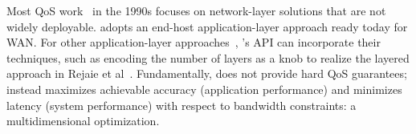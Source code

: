  Most QoS work~\cite{ferrari1990scheme, shenker1994integrated,
  shenker1995fundamental} in the 1990s focuses on network-layer solutions that
are not widely deployable. \sysname{} adopts an end-host application-layer
approach ready today for WAN. For other application-layer
approaches~\cite{vandalore2001survey}, \sysname{}'s API can incorporate their
techniques, such as encoding the number of layers as a knob to realize the
layered approach in Rejaie et al~\cite{rejaie2000layered}. Fundamentally,
\sysname{} does not provide hard QoS guarantees; instead \sysname{} maximizes
achievable accuracy (application performance) and minimizes latency (system
performance) with respect to bandwidth constraints: a multidimensional
optimization.





